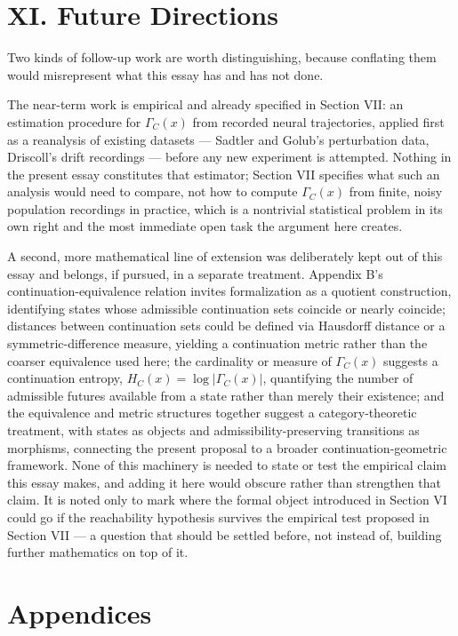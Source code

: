\documentclass[11pt]{article}
\begin{document}
\section*{XI. Future Directions}

Two kinds of follow-up work are worth distinguishing, because conflating them would misrepresent what this essay has and has not done.

The near-term work is empirical and already specified in Section VII: an estimation procedure for $\Gamma_C(x)$ from recorded neural trajectories, applied first as a reanalysis of existing datasets — Sadtler and Golub's perturbation data, Driscoll's drift recordings — before any new experiment is attempted. Nothing in the present essay constitutes that estimator; Section VII specifies what such an analysis would need to compare, not how to compute $\Gamma_C(x)$ from finite, noisy population recordings in practice, which is a nontrivial statistical problem in its own right and the most immediate open task the argument here creates.

A second, more mathematical line of extension was deliberately kept out of this essay and belongs, if pursued, in a separate treatment. Appendix B's continuation-equivalence relation invites formalization as a quotient construction, identifying states whose admissible continuation sets coincide or nearly coincide; distances between continuation sets could be defined via Hausdorff distance or a symmetric-difference measure, yielding a continuation metric rather than the coarser equivalence used here; the cardinality or measure of $\Gamma_C(x)$ suggests a continuation entropy, $H_C(x) = \log |\Gamma_C(x)|$, quantifying the number of admissible futures available from a state rather than merely their existence; and the equivalence and metric structures together suggest a category-theoretic treatment, with states as objects and admissibility-preserving transitions as morphisms, connecting the present proposal to a broader continuation-geometric framework. None of this machinery is needed to state or test the empirical claim this essay makes, and adding it here would obscure rather than strengthen that claim. It is noted only to mark where the formal object introduced in Section VI could go if the reachability hypothesis survives the empirical test proposed in Section VII — a question that should be settled before, not instead of, building further mathematics on top of it.

\newpage
\section*{Appendices}
\end{document}
